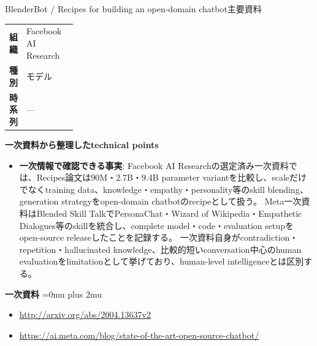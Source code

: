 \begin{technicalnote}{BlenderBot / Recipes for building an open-domain chatbot}{主要資料}
\begingroup
\begin{tabularx}{\linewidth}{@{}>{\bfseries}p{0.22\linewidth}X@{}}
組織 & Facebook AI Research \\
種別 & モデル \\
時系列 & — \\
\end{tabularx}
\smallskip
{\bfseries 一次資料から整理したtechnical points}
\begin{itemize}[leftmargin=1.5em,itemsep=0.35em]
\item \textbf{一次情報で確認できる事実}: Facebook AI Researchの選定済み一次資料では、Recipes論文は90M・2.7B・9.4B parameter variantを比較し、scaleだけでなくtraining data、knowledge・empathy・personality等のskill blending、generation strategyをopen-domain chatbotのrecipeとして扱う。 Meta一次資料はBlended Skill TalkでPersonaChat・Wizard of Wikipedia・Empathetic Dialogues等のskillを統合し、complete model・code・evaluation setupをopen-source releaseしたことを記録する。 一次資料自身がcontradiction・repetition・hallucinated knowledge、比較的短いconversation中心のhuman evaluationをlimitationとして挙げており、human-level intelligenceとは区別する。
\end{itemize}
\begin{minipage}{\linewidth}
\begin{samepage}
{\bfseries 一次資料}
\begingroup\sloppy
\Urlmuskip=0mu plus 2mu\relax
\begin{itemize}[leftmargin=1.5em,itemsep=0.25em]
\item {\scriptsize\url{http://arxiv.org/abs/2004.13637v2}}
\item {\scriptsize\url{https://ai.meta.com/blog/state-of-the-art-open-source-chatbot/}}
\end{itemize}
\endgroup
\end{samepage}
\end{minipage}
\endgroup
\end{technicalnote}
\medskip
